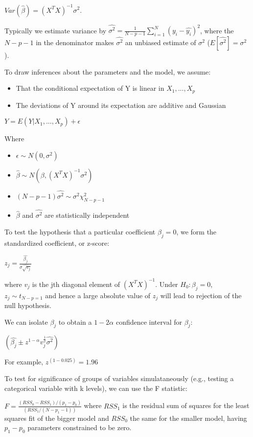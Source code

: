 \documentclass[11pt]{article}
\begin{document}
\(Var(\hat{\beta}) = (X^TX)^{-1}\sigma^2\). 

Typically we estimate variance by \(\hat{\sigma^2} = \frac{1}{N - p - 1}\sum_{i = 1}^{N}(y_i - \hat{y_i})^2\), where the \(N - p - 1\) in the denominator makes \(\hat{\sigma^2}\) an unbiased estimate of \(\sigma^2\) (\(E[\hat{\sigma^2}] = \sigma^2\)). 

To draw inferences about the parameters and the model, we assume: 

\begin{itemize}
\item That the conditional expectation of Y is linear in \(X_1, ..., X_p\)
\item The deviations of Y around its expectation are additive and Gaussian
\end{itemize}

\(Y = E(Y | X_1, ..., X_p) + \epsilon\)

Where 

\begin{itemize}
\item \(\epsilon \sim N(0, \sigma^2)\)
\item \(\hat{\beta} \sim N(\beta, (X^TX)^{-1}\sigma^2)\)
\item \((N-p-1)\hat{\sigma^2} \sim \sigma^2 \chi_{N - p - 1}^2\)
\item \(\hat{\beta}\) and \(\hat{\sigma^2}\) are statistically independent
\end{itemize}

To test the hypothesis that a particular coefficient \(\beta_j = 0\), we form the standardized coefficient, or z-score:

\(z_j = \frac{\hat{\beta_j}}{\hat{\sigma \sqrt{v_j}}}\)

where \(v_j\) is the jth diagonal element of \((X^TX)^{-1}\). Under \(H_0: \beta_j = 0\), \(z_j \sim t_{N - p = 1}\) and hence a large absolute value of \(z_j\) will lead to rejection of the null hypothesis.

We can isolate \(\beta_j\) to obtain a \(1 - 2 \alpha\) confidence interval for \(\beta_j\): 

\((\hat{\beta_j} \pm z^{1 - \alpha}v_{j}^{\frac{1}{2}}\hat{\sigma^2})\)

For example, \(z^{(1 - 0.025)} = 1.96\)

To test for significance of groups of variables simulataneously (e.g., testing a categorical variable with k levels), we can use the F statistic: 

\(F = \frac{(RSS_0 - RSS_1) / (p_1 - p_0)}{(RSS_1 / (N - p_1 - 1))}\) where \(RSS_1\) is the residual sum of squares for the least squares fit of the bigger model and \(RSS_0\) the same for the smaller model, having \(p_1 - p_0\) parameters constrained to be zero. 
\end{document}
